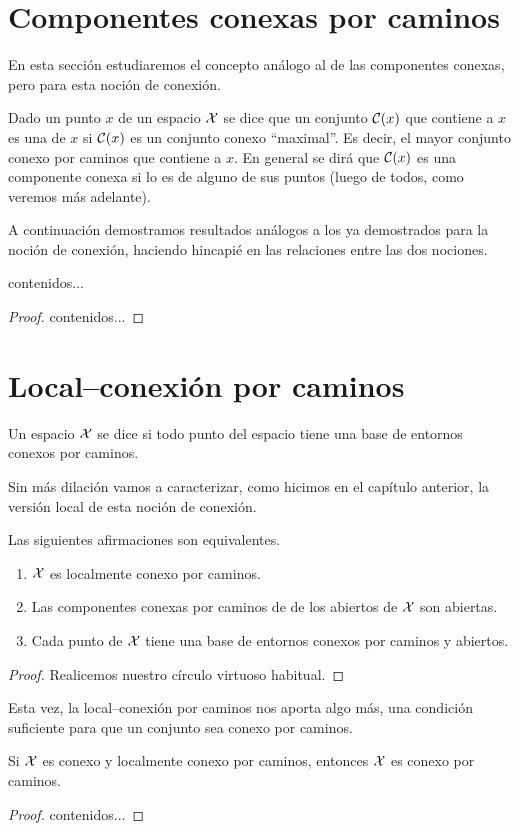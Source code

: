 \section{Componentes conexas por caminos}
En esta sección estudiaremos el concepto análogo al de las componentes conexas, pero para esta noción de conexión.
\begin{defi}
	Dado un punto $x$ de un espacio $\mathcal{X}$ se dice que un conjunto $\mathcal{C}(x)$ que contiene a $x$ es una  de $x$ si $\mathcal{C}(x)$ es un conjunto conexo ``maximal''. Es decir, el mayor conjunto conexo por caminos que contiene a $x$. En general se dirá que $\mathcal{C}(x)$ es una componente conexa si lo es de alguno de sus puntos (luego de todos, como veremos más adelante).
\end{defi}
A continuación demostramos resultados análogos a los ya demostrados para la noción de conexión, haciendo hincapié en las relaciones entre las dos nociones.
\begin{lem}
	contenidos...
\end{lem}
\begin{proof}
	contenidos...
\end{proof}
\section{Local--conexión por caminos}
\begin{defi}
	Un espacio $\mathcal{X}$ se dice  si todo punto del espacio tiene una base de entornos conexos por caminos.
\end{defi}
Sin más dilación vamos a caracterizar, como hicimos en el capítulo anterior, la versión local de esta noción de conexión.
\begin{lem}[Caracterización]
	Las siguientes afirmaciones son equivalentes.
	\begin{enumerate}
		\item $\mathcal{X}$ es localmente conexo por caminos.
		\item Las componentes conexas por caminos de de los abiertos de $\mathcal{X}$ son abiertas.
		\item Cada punto de $\mathcal{X}$ tiene una base de entornos conexos por caminos y abiertos.
	\end{enumerate}
\end{lem}
\begin{proof} Realicemos nuestro círculo virtuoso habitual.
\end{proof}
Esta vez, la local--conexión por caminos nos aporta algo más, una condición suficiente para que un conjunto sea conexo por caminos.
\begin{prop}
	Si $\mathcal{X}$ es conexo y localmente conexo por caminos, entonces $\mathcal{X}$ es conexo por caminos.
\end{prop}
\begin{proof}
	contenidos...
\end{proof}
